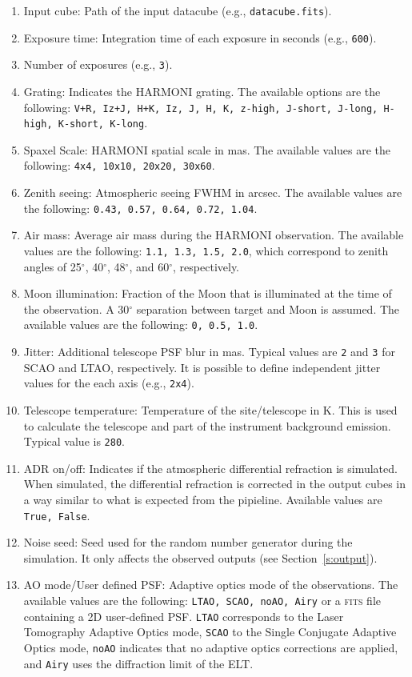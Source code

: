 \documentclass[12pt]{report}
\begin{document}
\begin{enumerate}
\setlength\itemsep{-0.5ex}
\item Input cube: Path of the input datacube (e.g., \texttt{datacube.fits}).
\item Exposure time: Integration time of each exposure in seconds (e.g., \texttt{600}).
\item Number of exposures (e.g., \texttt{3}).
\item Grating: Indicates the HARMONI grating. The available options are the following: \texttt{V+R, Iz+J, H+K, Iz, J, H, K, z-high, J-short, J-long, H-high, K-short, K-long}.
\item Spaxel Scale: HARMONI spatial scale in mas. The available values are the following: \texttt{4x4, 10x10, 20x20, 30x60}.
\item Zenith seeing: Atmospheric seeing FWHM in arcsec. The available values are the following: \texttt{0.43, 0.57, 0.64, 0.72, 1.04}.
\item Air mass: Average air mass during the HARMONI observation. The available values are the following: \texttt{1.1, 1.3, 1.5, 2.0}, which correspond to zenith angles of 25$^{\circ}$, 40$^{\circ}$, 48$^{\circ}$, and 60$^{\circ}$, respectively.
\item Moon illumination: Fraction of the Moon that is illuminated at the time of the observation. A 30$^{\circ}$ separation between target and Moon is assumed. The available values are the following: \texttt{0, 0.5, 1.0}.
\item Jitter: Additional telescope PSF blur in mas. Typical values are \texttt{2} and \texttt{3} for SCAO and LTAO, respectively. It is possible to define independent jitter values for the each axis (e.g., \texttt{2x4}).
\item Telescope temperature: Temperature of the site\slash telescope in K. This is used to calculate the telescope and part of the instrument background emission. Typical value is \texttt{280}.
\item ADR on/off: Indicates if the atmospheric differential refraction is simulated. When simulated, the differential refraction is corrected in the output cubes in a way similar to what is expected from the pipieline. Available values are \texttt{True, False}.
\item Noise seed: Seed used for the random number generator during the simulation. It only affects the observed outputs (see Section~\ref{s:output}).
\item AO mode/User defined PSF: Adaptive optics mode of the observations. The available values are the following: \texttt{LTAO, SCAO, noAO, Airy} or a \textsc{fits} file containing a 2D user-defined PSF. \texttt{LTAO} corresponds to the Laser Tomography Adaptive Optics mode,  \texttt{SCAO} to the Single Conjugate Adaptive Optics mode, \texttt{noAO} indicates that no adaptive optics corrections are applied, and \texttt{Airy} uses the diffraction limit of the ELT.

\end{enumerate}
\end{document}
